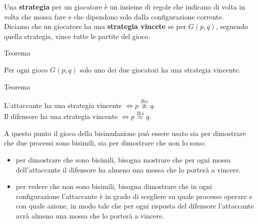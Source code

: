 Una \textbf{strategia} per un giocatore è un insieme di regole che indicano di volta in volta che mossa fare e che dipendono solo dalla configurazione corrente.\\
Diciamo che un giocatore ha una \textbf{strategia vincete} se per $G(p,q)$, seguendo quella strategia, vince tutte le partite del gioco.
\begin{teorema}{Teorema}{}
    \par\centering
    Per ogni gioco $G(p,q)$ solo uno dei due giocatori ha una strategia vincente.
\end{teorema}
\begin{teorema}{Teorema}{}
    \par\centering
    L’attaccante ha una strategia vincente $\iff p \stackrel{Bis}{\not\approx}q$.\\
    Il difensore ha una strategia vincente $\iff p \stackrel{Bis}{\approx}q$.
\end{teorema}

A questo punto il gioco della bisimulazione può essere usato sia per dimostrare che due processi sono bisimili, sia per dimostrare che non lo sono:
\begin{itemize}
    \item per dimostrare che sono bisimili, bisogna mostrare che per ogni mossa dell’attaccante il difensore ha almeno una mossa che lo porterà a vincere.
    \item per vedere che non sono bisimili, bisogna dimostrare che in ogni configurazione l’attaccante è in grado di scegliere su quale processo operare e con quale azione, in modo tale che per ogni risposta del difensore l’attaccante avrà almeno una mossa che lo porterà a vincere.
\end{itemize}
